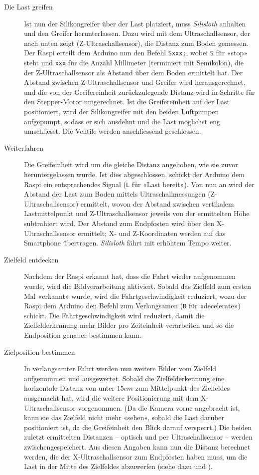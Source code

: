 \begin{description}
    \item[Die Last greifen] Ist nun der Silikongreifer über der Last platziert, muss \textit{Silisloth} anhalten und den Greifer herunterlassen. Dazu wird mit dem Ultraschallsensor, der nach unten zeigt (Z\hyp{Ul\-tra\-schall\-sen\-sor}), die Distanz zum Boden gemessen. Der Raspi erteilt dem Arduino nun den Befehl \texttt{Sxxx;}, wobei \texttt{S} für «stop» steht und \texttt{xxx} für die Anzahl Millimeter (terminiert mit Semikolon), die der Z-Ultraschallsensor als Abstand über dem Boden ermittelt hat. Der Abstand zwischen Z-Ultraschallsensor und Greifer wird herausgerechnet, und die von der Greifereinheit zurückzulegende Distanz wird in Schritte für den Stepper-Motor umgerechnet. Ist die Greifereinheit auf der Last positioniert, wird der Silikongreifer mit den beiden Luftpumpen aufgepumpt, sodass er sich ausdehnt und die Last möglichst eng umschliesst. Die Ventile werden anschliessend geschlossen.
    \item[Weiterfahren] Die Greifeinheit wird um die gleiche Distanz angehoben, wie sie zuvor heruntergelassen wurde. Ist dies abgeschlossen, schickt der Arduino dem Raspi ein entsprechendes Signal (\texttt{L} für «Last bereit»). Von nun an wird der Abstand der Last zum Boden mittels Ultraschallmessungen (Z-Ultraschallsensor) ermittelt, wovon der Abstand zwischen vertikalem Lastmittelpunkt und Z-Ultraschallsensor jeweils von der ermittelten Höhe subtrahiert wird. Der Abstand zum Endpfosten wird über den X-Ultraschallsensor ermittelt; X- und Z-Koordinaten werden auf das Smartphone übertragen. \textit{Silisloth} fährt mit erhöhtem Tempo weiter.
    \item[Zielfeld entdecken] Nachdem der Raspi erkannt hat, dass die Fahrt wieder aufgenommen wurde, wird die Bildverarbeitung aktiviert. Sobald das Zielfeld zum ersten Mal «erkannt» wurde, wird die Fahrtgeschwindigkeit reduziert, wozu der Raspi dem Arduino den Befehl zum Verlangsamen (\texttt{D} für «decelerate») schickt. Die Fahrtgeschwindigkeit wird reduziert, damit die Zielfelderkennung mehr Bilder pro Zeiteinheit verarbeiten und so die Endposition genauer bestimmen kann.
    \item[Zielposition bestimmen] In verlangsamter Fahrt werden nun weitere Bilder vom Zielfeld aufgenommen und ausgewertet. Sobald die Zielfelderkennung eine horizontale Distanz von unter $15cm$ zum Mittelpunkt des Zielfeldes ausgemacht hat, wird die weitere Positionierung mit dem X-Ultraschallsensor vorgenommen. (Da die Kamera vorne angebracht ist, kann sie das Zielfeld nicht mehr «sehen», sobald die Last darüber positioniert ist, da die Greifeinheit den Blick darauf versperrt.) Die beiden zuletzt ermittelten Distanzen -- optisch und per Ultraschallsensor -- werden zwischengespeichert. Aus diesen Angaben kann nun die Distanz berechnet werden, die der X-Ultraschallsensor zum Endpfosten haben muss, um die Last in der Mitte des Zielfeldes abzuwerfen (siehe dazu  und ).

\end{description}
